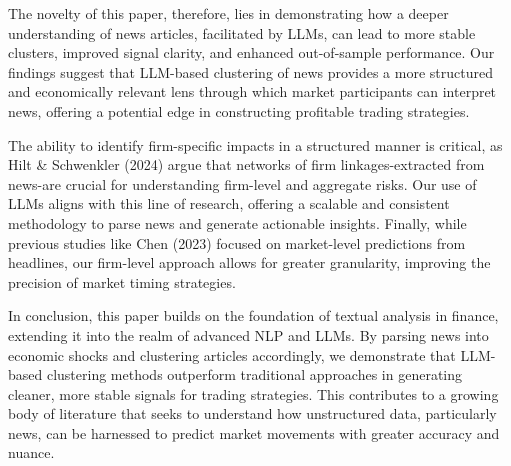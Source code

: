 The novelty of this paper, therefore, lies in demonstrating how a deeper understanding of news articles, facilitated by LLMs, can lead to more stable clusters, improved signal clarity, and enhanced out-of-sample performance. Our findings suggest that LLM-based clustering of news provides a more structured and economically relevant lens through which market participants can interpret news, offering a potential edge in constructing profitable trading strategies.

The ability to identify firm-specific impacts in a structured manner is critical, as Hilt & Schwenkler (2024) argue that networks of firm linkages-extracted from news-are crucial for understanding firm-level and aggregate risks. Our use of LLMs aligns with this line of research, offering a scalable and consistent methodology to parse news and generate actionable insights. Finally, while previous studies like Chen (2023) focused on market-level predictions from headlines, our firm-level approach allows for greater granularity, improving the precision of market timing strategies.

In conclusion, this paper builds on the foundation of textual analysis in finance, extending it into the realm of advanced NLP and LLMs. By parsing news into economic shocks and clustering articles accordingly, we demonstrate that LLM-based clustering methods outperform traditional approaches in generating cleaner, more stable signals for trading strategies. This contributes to a growing body of literature that seeks to understand how unstructured data, particularly news, can be harnessed to predict market movements with greater accuracy and nuance.

%



